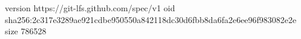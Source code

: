 version https://git-lfs.github.com/spec/v1
oid sha256:2c317e3289ae921cdbe950550a842118dc30d6fbb8da6fa2e6ee96f983082e2e
size 786528
